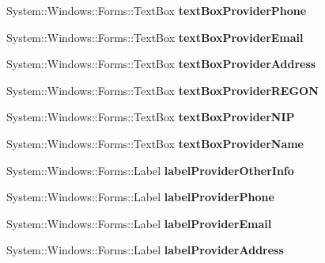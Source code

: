 \begin{DoxyCompactItemize}
System\+::\+Windows\+::\+Forms\+::\+Text\+Box {\bfseries text\+Box\+Provider\+Phone}
\item 
\hypertarget{class_magazyn_1_1_magazin_a985dee5952d5e96206a3c1086f593514}{}\label{class_magazyn_1_1_magazin_a985dee5952d5e96206a3c1086f593514} 
System\+::\+Windows\+::\+Forms\+::\+Text\+Box {\bfseries text\+Box\+Provider\+Email}
\item 
\hypertarget{class_magazyn_1_1_magazin_af387c7ddea94322662dacb680509af84}{}\label{class_magazyn_1_1_magazin_af387c7ddea94322662dacb680509af84} 
System\+::\+Windows\+::\+Forms\+::\+Text\+Box {\bfseries text\+Box\+Provider\+Address}
\item 
\hypertarget{class_magazyn_1_1_magazin_a601e4042f43b92d99baacd1609767296}{}\label{class_magazyn_1_1_magazin_a601e4042f43b92d99baacd1609767296} 
System\+::\+Windows\+::\+Forms\+::\+Text\+Box {\bfseries text\+Box\+Provider\+R\+E\+G\+ON}
\item 
\hypertarget{class_magazyn_1_1_magazin_a2707632e2c51399fbc7056399a18df1f}{}\label{class_magazyn_1_1_magazin_a2707632e2c51399fbc7056399a18df1f} 
System\+::\+Windows\+::\+Forms\+::\+Text\+Box {\bfseries text\+Box\+Provider\+N\+IP}
\item 
\hypertarget{class_magazyn_1_1_magazin_af895c0473699e31194c7f900f9a8a751}{}\label{class_magazyn_1_1_magazin_af895c0473699e31194c7f900f9a8a751} 
System\+::\+Windows\+::\+Forms\+::\+Text\+Box {\bfseries text\+Box\+Provider\+Name}
\item 
\hypertarget{class_magazyn_1_1_magazin_a3b1e795f2e75b601c31f17f1a30b53fd}{}\label{class_magazyn_1_1_magazin_a3b1e795f2e75b601c31f17f1a30b53fd} 
System\+::\+Windows\+::\+Forms\+::\+Label {\bfseries label\+Provider\+Other\+Info}
\item 
\hypertarget{class_magazyn_1_1_magazin_aebd4fac769c4ff8068130451d2b8cdf1}{}\label{class_magazyn_1_1_magazin_aebd4fac769c4ff8068130451d2b8cdf1} 
System\+::\+Windows\+::\+Forms\+::\+Label {\bfseries label\+Provider\+Phone}
\item 
\hypertarget{class_magazyn_1_1_magazin_a64347c9e0058f70768b6ddc7d53a9f1e}{}\label{class_magazyn_1_1_magazin_a64347c9e0058f70768b6ddc7d53a9f1e} 
System\+::\+Windows\+::\+Forms\+::\+Label {\bfseries label\+Provider\+Email}
\item 
\hypertarget{class_magazyn_1_1_magazin_aac3cc6afb507d37716869e9a72e4d440}{}\label{class_magazyn_1_1_magazin_aac3cc6afb507d37716869e9a72e4d440} 
System\+::\+Windows\+::\+Forms\+::\+Label {\bfseries label\+Provider\+Address}
\item 
\hypertarget{class_magazyn_1_1_magazin_a33f57d74033fe00f26f0a568f5e9f0b1}{}\label{class_magazyn_1_1_magazin_a33f57d74033fe00f26f0a568f5e9f0b1} 

\end{DoxyCompactItemize}
